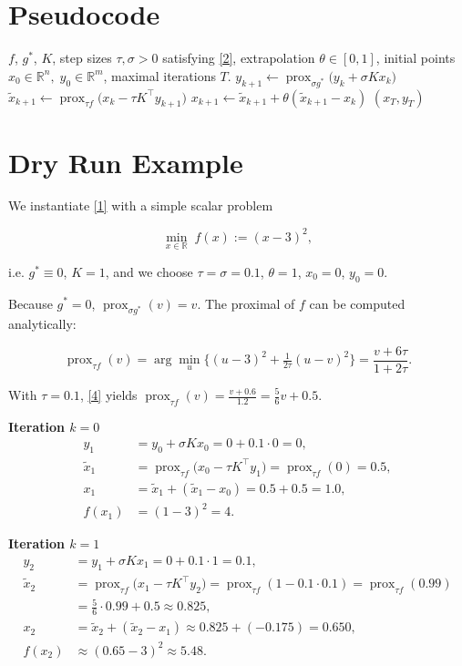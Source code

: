 \documentclass{article}
\newcommand{\prox}{\operatorname{prox}}
\begin{document}
\section*{Pseudocode}
\begin{algorithm}[H]
\caption{Primal–Dual Hybrid Gradient (PDHG)}\label{alg:pdhg}
\begin{algorithmic}[1]
\REQUIRE $f$, $g^{*}$, $K$, step sizes $\tau,\sigma>0$ satisfying \eqref{2}, extrapolation $\theta\in[0,1]$, initial points $x_{0}\in\mathbb R^{n},\;y_{0}\in\mathbb R^{m}$, maximal iterations $T$.
    \STATE $y_{k+1}\gets \prox_{\sigma g^{*}}\!\bigl(y_{k}+ \sigma Kx_{k}\bigr)$ \hfill{}
    \STATE $\tilde x_{k+1}\gets \prox_{\tau f}\!\bigl(x_{k}-\tau K^{\top} y_{k+1}\bigr)$ \hfill{}
    \STATE $x_{k+1}\gets \tilde x_{k+1}+ \theta(\tilde x_{k+1}-x_{k})$ \hfill{}
\ENDFOR
\RETURN $(x_{T},y_{T})$
\end{algorithmic}
\end{algorithm}

\section*{Dry Run Example}
We instantiate \eqref{1} with a simple scalar problem  

\[
\min_{x\in\mathbb R} \; f(x):=(x-3)^{2},
\]

i.e. $g^{*}\equiv0$, $K=1$, and we choose $\tau=\sigma=0.1$, $\theta=1$, $x_{0}=0$, $y_{0}=0$.

Because $g^{*}=0$, $\prox_{\sigma g^{*}}(v)=v$.
The proximal of $f$ can be computed analytically:

\[
\prox_{\tau f}(v)=\arg\min_{u}\big\{(u-3)^{2}+\tfrac{1}{2\tau}(u-v)^{2}\big\}
               =\frac{v+6\tau}{1+2\tau}.
\tag{4}
\]

With $\tau=0.1$, \eqref{4} yields $\prox_{\tau f}(v)=\frac{v+0.6}{1.2}= \frac{5}{6}v+0.5$.

\medskip
\noindent\textbf{Iteration $k=0$}
\begin{align*}
y_{1}&=y_{0}+ \sigma K x_{0}=0+0.1\cdot0=0,\\
\tilde x_{1}&=\prox_{\tau f}\!\bigl(x_{0}-\tau K^{\top} y_{1}\bigr)
           =\prox_{\tau f}(0)=0.5,\\
x_{1}&=\tilde x_{1}+(\tilde x_{1}-x_{0})=0.5+0.5=1.0,\\
f(x_{1})&=(1-3)^{2}=4.
\end{align*}

\noindent\textbf{Iteration $k=1$}
\begin{align*}
y_{2}&=y_{1}+ \sigma K x_{1}=0+0.1\cdot1=0.1,\\
\tilde x_{2}&=\prox_{\tau f}\!\bigl(x_{1}-\tau K^{\top} y_{2}\bigr)
           =\prox_{\tau f}(1-0.1\cdot0.1)=\prox_{\tau f}(0.99)\\
           &=\frac{5}{6}\cdot0.99+0.5\approx0.825,\\
x_{2}&=\tilde x_{2}+(\tilde x_{2}-x_{1})\approx0.825+(-0.175)=0.650,\\
f(x_{2})&\approx(0.65-3)^{2}\approx5.48.
\end{align*}
\end{document}
